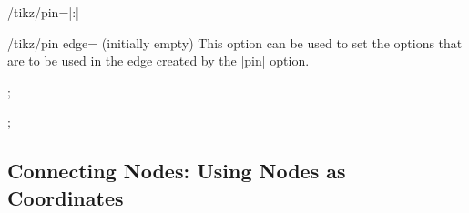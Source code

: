 \begin{key}{/tikz/pin=|:|}
  \begin{key}{/tikz/pin edge= (initially \normalfont empty)}
    This option can be used to set the options that are to be used
    in the edge created by the |pin| option.
\begin{codeexample}[]
\tikz[pin distance=10mm]
  ;
\end{codeexample}
\begin{codeexample}[]
\tikz [every pin edge/.style={},
       initial/.style={pin={[pin distance=5mm,
                             pin edge={<-,shorten <=1pt}]left:start}}]
  ;
\end{codeexample}
  \end{key}
\end{key}


\subsection{Connecting Nodes: Using Nodes as Coordinates}

\label{section-nodes-connecting}

